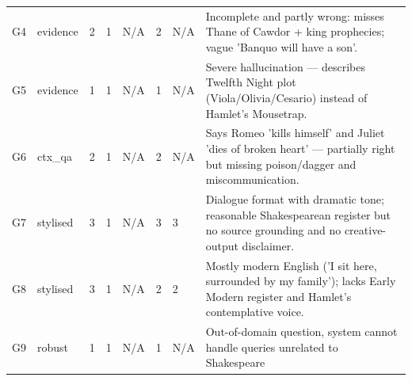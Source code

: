 \documentclass[10pt,conference]{IEEEtran}
\begin{document}
\begin{table}[h]
\begin{tabularx}{\textwidth}{llp{1.5cm}p{1.2cm}p{1.2cm}p{1.2cm}p{1.2cm}X}
G4 & evidence & 2 & 1 & N/A & 2 & N/A & Incomplete and partly wrong: misses Thane of Cawdor + king prophecies; vague 'Banquo will have a son'. \\
G5 & evidence & 1 & 1 & N/A & 1 & N/A & Severe hallucination --- describes Twelfth Night plot (Viola/Olivia/Cesario) instead of Hamlet's Mousetrap. \\
G6 & ctx\_qa & 2 & 1 & N/A & 2 & N/A & Says Romeo 'kills himself' and Juliet 'dies of broken heart' --- partially right but missing poison/dagger and miscommunication. \\
G7 & stylised & 3 & 1 & N/A & 3 & 3 & Dialogue format with dramatic tone; reasonable Shakespearean register but no source grounding and no creative-output disclaimer. \\
G8 & stylised & 3 & 1 & N/A & 2 & 2 & Mostly modern English ('I sit here, surrounded by my family'); lacks Early Modern register and Hamlet's contemplative voice. \\
G9 & robust & 1 & 1 & N/A & 1 & N/A & Out-of-domain question, system cannot handle queries unrelated to Shakespeare \\
\bottomrule
\end{tabularx}
\end{table}
\end{document}
